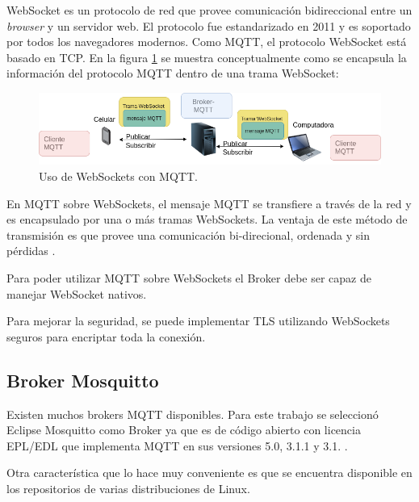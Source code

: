 WebSocket es un protocolo de red que provee comunicación bidireccional entre un \textit{browser} y un servidor web. El protocolo fue estandarizado en 2011 y es soportado por todos los navegadores modernos. Como MQTT, el protocolo WebSocket está basado en TCP. En la figura \ref{fig:WebSockets MQTT} se muestra conceptualmente como se encapsula la información del protocolo MQTT dentro de una trama WebSocket:

\begin{figure}[ht]
	\centering
	\includegraphics[scale=.45]{./Figures/websocket.png}
	\caption{Uso de WebSockets con MQTT.}
	\label{fig:WebSockets MQTT}
\end{figure}

En MQTT sobre WebSockets, el mensaje MQTT se transfiere a través de la red y es encapsulado por una o más tramas WebSockets. La ventaja de este método de transmisión es que provee una comunicación bi-direcional, ordenada y sin pérdidas \citep{WEBSITE:6} .

Para poder utilizar MQTT sobre WebSockets el Broker debe ser capaz de manejar WebSocket nativos. 

Para mejorar la seguridad, se puede implementar TLS utilizando WebSockets seguros para encriptar toda la conexión.

\label{subsec:Broker Mosquitto}
\subsection{Broker Mosquitto}

Existen muchos brokers MQTT disponibles. Para este trabajo se seleccionó Eclipse Mosquitto como Broker ya que es de código abierto con licencia EPL/EDL que implementa MQTT en sus versiones 5.0, 3.1.1 y 3.1. \citep{WEBSITE:7}.

Otra característica que lo hace muy conveniente es que se encuentra disponible en los repositorios de varias distribuciones de Linux. 





